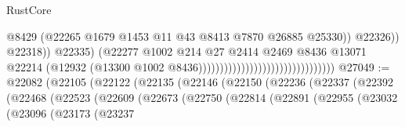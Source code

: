 \begin{lexlean}{RustCore}
\begin{coremodule}
                                                                          @8429
                                                                          (@22265
                                                                            @1679
                                                                            @1453
                                                                            @11
                                                                            @43
                                                                            @8413
                                                                            @7870
                                                                            @26885
                                                                            @25330))
                                                                        @22326))
                                                                    @22318))
                                                                @22335)
                                                              (@22277
                                                                @1002
                                                                @214
                                                                @27
                                                                @2414
                                                                @2469
                                                                @8436
                                                                @13071
                                                                @22214
                                                                (@12932
                                                                  (@13300
                                                                    @1002
                                                                    @8436))))))))))))))))))))))))))))))))
@27049 := @22082
    (@22105
      (@22122
        (@22135
          (@22146
            (@22150
              (@22236
                (@22337
                  (@22392
                    (@22468
                      (@22523
                        (@22609
                          (@22673
                            (@22750
                              (@22814
                                (@22891
                                  (@22955
                                    (@23032
                                      (@23096
                                        (@23173
                                          (@23237

\end{coremodule}
\end{lexlean}
